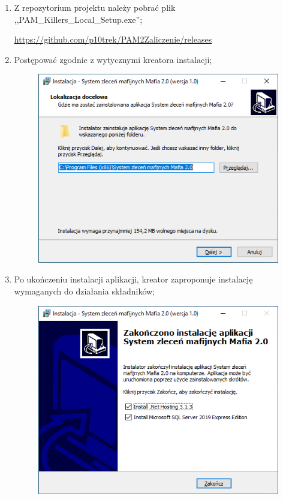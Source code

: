 \documentclass[12pt,a4paper]{article}
\begin{document}
			\begin{enumerate}
				\item Z repozytorium projektu należy pobrać plik ,,PAM\_Killers\_Local\_Setup.exe'';
					\begin{tcolorbox}[minipage,colback=white,arc=0pt,outer arc=0pt, fontupper=\footnotesize]
						\url{https://github.com/p10trek/PAM2Zaliczenie/releases}
					\end{tcolorbox}
					
				\item Postępować zgodnie z wytycznymi kreatora instalacji;
				\begin{figure}[H]
					\centering
					\includegraphics[scale=0.5]{img/Local_Install_1.png}

				\end{figure}
				
				\item Po ukończeniu instalacji aplikacji, kreator zaproponuje instalację wymaganych do działania składników;
					\begin{figure}[H]
						\centering
						\includegraphics[scale=0.5]{img/Local_Install_2.png}
					\end{figure}		
					

\end{enumerate}
\end{document}
